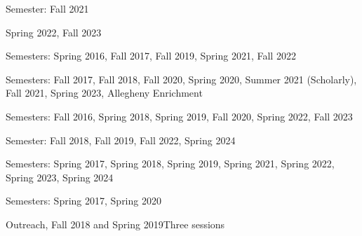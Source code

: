 \documentclass[11pt,a4paper]{moderncv}
\begin{document}
{Semester: Fall 2021}{}{}{}

{Spring 2022, Fall 2023}{}{}{}


{Semesters: Spring 2016, Fall 2017, Fall 2019, Spring 2021, Fall 2022}{}{}{}


{Semesters: Fall 2017, Fall 2018, Fall 2020, Spring 2020, Summer 2021 (Scholarly), Fall 2021, Spring 2023, Allegheny Enrichment}{}{}{}

{Semesters: Fall 2016, Spring 2018, Spring 2019, Fall 2020, Spring 2022, Fall 2023}{}{}{}


{Semester: Fall 2018, Fall 2019, Fall 2022, Spring 2024}{}{}{}


{Semesters: Spring 2017, Spring 2018, Spring 2019, Spring 2021, Spring 2022, Spring 2023, Spring 2024}{}{}{}


{Semesters: Spring 2017, Spring 2020}{}{}{}


{Outreach, Fall 2018 and Spring 2019}{Three sessions}{}{}
\end{document}
